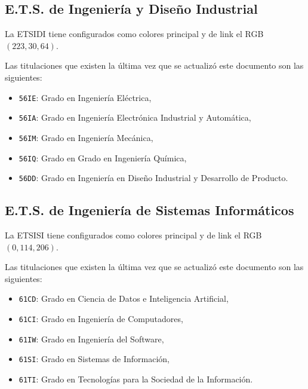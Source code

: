 \documentclass[%
    school=etsisi,%
    type=tfg,%
    degree=61CD,%
]{upm-report}
\begin{document}
\subsection{E.T.S. de Ingeniería y Diseño Industrial}

La ETSIDI tiene configurados como colores principal y de link el RGB $(223,30,64)$.

Las titulaciones que existen la última vez que se actualizó este documento son las siguientes:

\begin{itemize}
    \item \texttt{56IE}: Grado en Ingeniería Eléctrica,
    \item \texttt{56IA}: Grado en Ingeniería Electrónica Industrial y Automática,
    \item \texttt{56IM}: Grado en Ingeniería Mecánica,
    \item \texttt{56IQ}: Grado en Grado en Ingeniería Química,
    \item \texttt{56DD}: Grado en Ingeniería en Diseño Industrial y Desarrollo de Producto.
\end{itemize}

\subsection{E.T.S. de Ingeniería de Sistemas Informáticos}

La ETSISI tiene configurados como colores principal y de link el RGB $(0,114,206)$.

Las titulaciones que existen la última vez que se actualizó este documento son las siguientes:

\begin{itemize}
    \item \texttt{61CD}: Grado en Ciencia de Datos e Inteligencia Artificial,
    \item \texttt{61CI}: Grado en Ingeniería de Computadores,
    \item \texttt{61IW}: Grado en Ingeniería del Software,
    \item \texttt{61SI}: Grado en Sistemas de Información,
    \item \texttt{61TI}: Grado en Tecnologías para la Sociedad de la Información.
\end{itemize}
\end{document}
